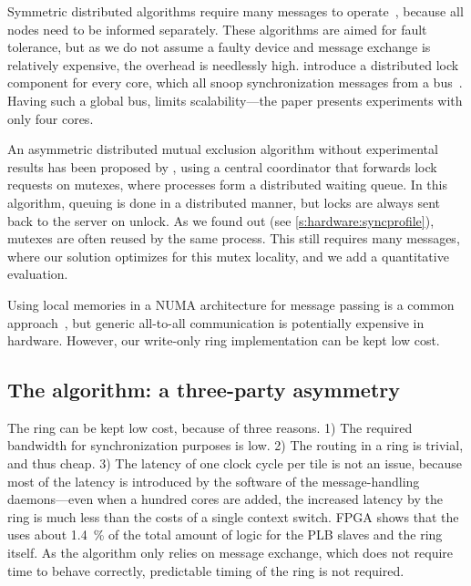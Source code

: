 Symmetric distributed algorithms require many messages to operate~\cite{singhal:distlock}, because all nodes need to be informed separately.
These algorithms are aimed for fault tolerance, but as we do not assume a faulty device and message exchange is relatively expensive, the overhead is needlessly high.
\citeauthor{yu:distlock} introduce a distributed lock component for every core, which all snoop synchronization messages from a bus~\cite{yu:distlock}.
Having such a global bus, limits scalability---the paper presents experiments with only four cores.

An asymmetric distributed mutual exclusion algorithm without experimental results has been proposed by \citet{wu:token}, using a central coordinator that forwards lock requests on mutexes, where processes form a distributed waiting queue.
In this algorithm, queuing is done in a distributed manner, but locks are always sent back to the server on unlock.
As we found out (see \cref{s:hardware:syncprofile}), mutexes are often reused by the same process.
This still requires many messages, where our solution optimizes for this mutex locality, and we add a quantitative evaluation.

Using local memories in a \acs{NUMA} architecture for message passing is a common approach~\cite{howard:intel_scc,casu:hybrid_noc}, but generic all-to-all communication is potentially expensive in hardware.
However, our write-only ring implementation can be kept low cost.

\subsection{The algorithm: a three-party asymmetry}
\label{s:hardware:distlock:algorithm}

The ring can be kept low cost, because of three reasons.
1) The required bandwidth for synchronization purposes is low.
2) The routing in a ring is trivial, and thus cheap.
3) The latency of one clock cycle per tile is not an issue, because most of the latency is introduced by the software of the message-handling daemons---even when a hundred cores are added, the increased latency by the ring is much less than the costs of a single context switch.
\Ac{FPGA}  shows that the  uses about \SI{1.4}{\percent} of the total amount of logic for the \ac{PLB} slaves and the ring itself.
As the algorithm only relies on message exchange, which does not require time to behave correctly, predictable timing of the ring is not required.

